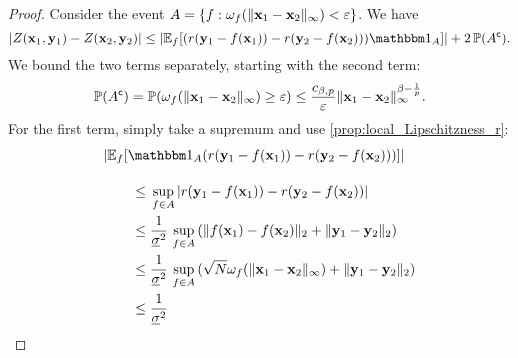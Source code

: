 \documentclass[12pt]{report}
\begin{document}
\begin{proof}
    Consider the event $A = \{f : 
        \omega_f(\lVert\mathbf{x}_1 - \mathbf{x}_2\rVert_\infty) < \varepsilon
    \}$.
    We have
    \begin{equation}
        \abs{Z(\vx_1, \vy_1) - Z(\vx_2, \vy_2)}
         \le 
            \abs{\E_f[
                (
                    r(\vy_1 - f(\vx_1)) 
                    - r(\vy_2 - f(\vx_2)) 
                ) \ind_A
            ]}
            + 2\, \P(A^\c).
    \end{equation}
    We bound the two terms separately, starting with the second term:
    \begin{equation}
        \P(A^\c)
        =
            \P(\omega_f(\norm{\vx_1 - \vx_2}_\infty) \ge \e)
        \le 
        \frac{c_{\beta, p}}{\e} \norm{\vx_1 - \vx_2}_\infty^{\beta - \frac{1}{p}}.
    \end{equation}
    For the first term, simply take a supremum and use \cref{prop:local_Lipschitzness_r}:
    \begin{align}
        &\abs{\E_f[
            \ind_A
            (
                r(\vy_1 - f(\vx_1)) 
                - r(\vy_2 - f(\vx_2)) 
            ) 
        ]}
        \vphantom{\frac{}{\underline{\sigma}^2}}
        \nonumber \\
        &\qquad \le 
            \vphantom{\frac{1}{\underline{\sigma}^2}}
            \sup_{f \in A} \, 
                \abs{
                    r(\vy_1 - f(\vx_1)) 
                    - r(\vy_2 - f(\vx_2)) 
                } \\
        &\qquad \le 
            \frac{1}{\underline{\sigma}^2}\, \sup_{f \in A} \, 
                (\norm{f(\vx_1) - f(\vx_2)}_2 + \norm{\vy_1 - \vy_2}_2) \\
        &\qquad \le 
            \frac{1}{\underline{\sigma}^2}\, \sup_{f \in A} \, 
                (\sqrt{N}\omega_f(\norm{\vx_1 - \vx_2}_\infty) + \norm{\vy_1 - \vy_2}_2) \\
        &\qquad \le 
            \frac{1}{\underline{\sigma}^2}\,

\end{align}
\end{proof}
\end{document}

